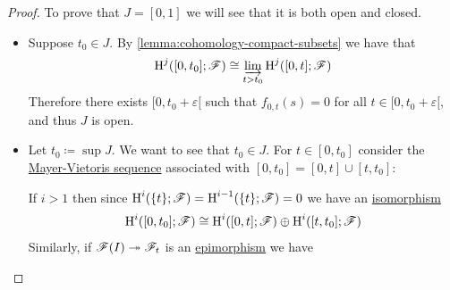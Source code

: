\documentclass[../../main]{subfiles}
\begin{document}
\begin{proof}
  To prove that \(J = [0, 1]\) we will see that it is both open and closed.
  \begin{itemize}
    \item[Open] Suppose \(t_{0} \in J\). By \autoref{lemma:cohomology-compact-subsets} we have that
          \begin{equation*}
            \operatorname{H}^{j}([0, t_{0}]; \mathscr{F}) \cong \varinjlim_{t > t_{0}} \operatorname{H}^{j}([0, t]; \mathscr{F})
          \end{equation*}
          Therefore there exists \([0, t_{0} + \varepsilon[\) such that \(f_{0, t}(s) = 0\) for all \(t \in [0, t_{0} + \varepsilon[\), and thus \(J\) is open.
    \item[Closed] Let \(t_{0} \coloneq \operatorname{sup} J\). We want to see that \(t_{0} \in J\).
          For \(t \in [0, t_{0}]\) consider the \hyperref[thm:mayer-vietoris-closed]{Mayer-Vietoris sequence} associated with \([0, t_{0}] = [0, t] \cup [t, t_{0}]\):
          \begin{center}
          \end{center}
          If \(i > 1\) then since \(\operatorname{H}^{i}(\{t\}; \mathscr{F}) = \operatorname{H}^{i-1}(\{t\}; \mathscr{F}) = 0\) we have an \hyperref[def:categorical-isomorphism]{isomorphism}
          \begin{equation*}
            \operatorname{H}^{i}([0, t_{0}]; \mathscr{F}) \cong \operatorname{H}^{i}([0, t]; \mathscr{F}) \oplus \operatorname{H}^{i}([t, t_{0}]; \mathscr{F})
          \end{equation*}
          Similarly, if \(\mathscr{F}(I) \twoheadrightarrow \mathscr{F}_{t}\) is an \hyperref[def:mono-epi-morphism]{epimorphism} we have
          \begin{center}
          \end{center}


\end{itemize}
\end{proof}
\end{document}
